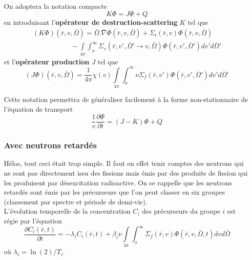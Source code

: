 On adoptera la notation compacte
\begin{equation}
K\varPhi  = J\varPhi  + Q
\end{equation}
en introduisant l'\textbf{opérateur de destruction-scattering} $K$ tel que
\begin{equation}
\begin{array}{l}
(K\varPhi )(\bar r,v,\bar \Omega ) = \bar \Omega .\bar \nabla \varPhi (\bar r,v,\bar \Omega ) + {\Sigma _t}(\bar r,v)\varPhi (\bar r,v,\bar \Omega )\\
\quad \quad \quad \quad \quad \;\; - \int\limits_{4\pi }    \int_o^\infty     {\Sigma _s}(\bar r,v',\bar \Omega ' \to v,\bar \Omega )\varPhi (\bar r,v',\bar \Omega ')dv'd\bar \Omega '
\end{array}
\end{equation}
et l'\textbf{opérateur production} $J$ tel que
\begin{equation}
(J\varPhi )(\bar r,v,\bar \Omega ) = \frac{1}{{4\pi }}\chi (v)\int\limits_{4\pi }    \int_o^\infty     \nu {\Sigma _f}(\bar r,v')\varPhi (\bar r,v',\bar \Omega ')dv'd\bar \Omega '
\end{equation}

Cette notation permettra de généraliser facilement à la forme non-stationnaire de l'équation de transport
\begin{equation}
\frac{1}{v}\frac{{\partial \varPhi }}{{\partial t}} = (J - K)\varPhi  + Q
\end{equation}


\subsubsection{Avec neutrons retardés}
Hélas, tout ceci était trop simple. Il faut en effet tenir comptes des neutrons qui ne sont pas 
directement issu des fissions mais émis par des produits de fission qui les produisent par 
désexcitation radioactive. On se rappelle que les neutrons retardés sont émis par les précurseurs 
que l'on peut classer en six groupes (classement par spectre et période de demi-vie).\\

L'évolution temporelle de la concentration $C_i$ des précurseurs du groupe $i$ est régie par l'équation
\begin{equation}
\frac{{\partial {C_i}(\bar r,t)}}{{\partial t}} = - {\lambda _i}{C_i}(\bar r,t)
 + \beta_i \nu \int\limits_{4\pi }    \int_o^\infty     {\Sigma _f}(\bar r,v)\varPhi (\bar r,v,\bar \Omega ,t)dvd\bar \Omega 
\end{equation}
où $\lambda_i = \ln(2)/T_i$.\\

